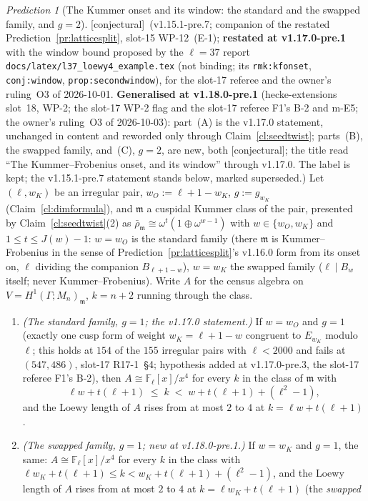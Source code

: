 \documentclass[11pt]{article}
\theoremstyle{remark}
\newtheorem{prediction}[theorem]{Prediction}
\newcommand{\F}{\mathbb{F}}
\newcommand{\Ga}{\Gamma}
\newcommand{\Fl}{\F_\ell}
\newcommand{\m}{\mathfrak{m}}
\newcommand{\Mn}{M_n}
\newcommand{\CONJ}{\textsf{[conjectural]}}
\begin{document}
\begin{prediction}[The Kummer onset and its window: the standard and the swapped family, and $g=2$]\label{pr:kfonset}\CONJ\ (v1.15.1-pre.7; companion of the restated
Prediction~\ref{pr:latticesplit}, slot-15 WP-12~(E-1); \textbf{restated at v1.17.0-pre.1} with the window bound proposed by the $\ell=37$ report
\texttt{docs/latex/l37\_loewy4\_example.tex} (not binding; its \texttt{rmk:kfonset}, \texttt{conj:window}, \texttt{prop:secondwindow}), for the slot-17
referee and the owner's ruling~O3 of 2026-10-01. \textbf{Generalised at v1.18.0-pre.1} (hecke-extensions slot~18, WP-2; the slot-17 WP-2 flag and the slot-17
referee F1's B-2 and m-E5; the owner's ruling~O3 of 2026-10-03): part~(A) is the v1.17.0 statement, unchanged in content and reworded only through
Claim~\ref{cl:seedtwist}; parts~(B), the swapped family, and~(C), $g=2$, are new, both \CONJ; the title read ``The Kummer--Frobenius onset, and its window''
through v1.17.0. The label is kept; the v1.15.1-pre.7 statement stands below, marked superseded.)
Let $(\ell,w_K)$ be an irregular pair, $w_O:=\ell+1-w_K$, $g:=g_{w_K}$ (Claim~\ref{cl:dimformula}), and $\m$ a cuspidal Kummer class of the pair, presented
by Claim~\ref{cl:seedtwist}(2) as $\bar\rho_\m\cong\omega^{t}(1\oplus\omega^{w-1})$ with $w\in\{w_O,w_K\}$ and $1\le t\le J(w)-1$: $w=w_O$ is the standard family
(there $\m$ is Kummer--Frobenius in the sense of Prediction~\ref{pr:latticesplit}'s v1.16.0 form from its onset on, $\ell$ dividing the companion $B_{\ell+1-w}$),
$w=w_K$ the swapped family ($\ell\mid B_w$ itself; never Kummer--Frobenius). Write $A$ for the census algebra on $V=H^1(\Ga;\Mn)_\m$, $k=n+2$ running through the
class.
\begin{enumerate}
\item[(A)] \emph{(The standard family, $g=1$; the v1.17.0 statement.)} If $w=w_O$ and $g=1$ (exactly one cusp form of weight $w_K=\ell+1-w$ congruent to
  $E_{w_K}$ modulo~$\ell$; this holds at $154$ of the $155$ irregular pairs with $\ell<2000$ and fails at $(547,486)$, slot-17 R17-1~\S4; hypothesis added at
  v1.17.0-pre.3, the slot-17 referee F1's B-2), then $A\cong\Fl[x]/x^4$ for every $k$ in the class of $\m$ with
  \[
    \ell w+t(\ell+1)\;\le\;k\;<\;w+t(\ell+1)+(\ell^{2}-1),
  \]
  and the Loewy length of $A$ rises from at most $2$ to $4$ at $k=\ell w+t(\ell+1)$.
\item[(B)] \emph{(The swapped family, $g=1$; new at v1.18.0-pre.1.)} If $w=w_K$ and $g=1$, the same: $A\cong\Fl[x]/x^4$ for every $k$ in the class with
  $\ell w_K+t(\ell+1)\le k<w_K+t(\ell+1)+(\ell^{2}-1)$, and the Loewy length of $A$ rises from at most $2$ to $4$ at $k=\ell w_K+t(\ell+1)$ (the \emph{swapped
}
\end{enumerate}
\end{prediction}
\end{document}
